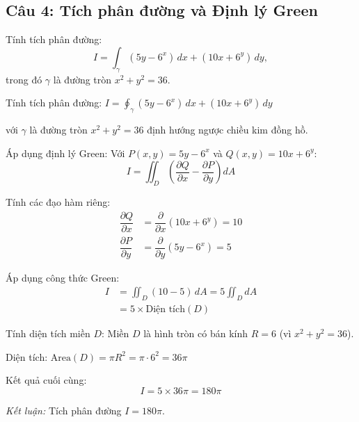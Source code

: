 \subsection*{Câu 4: Tích phân đường và Định lý Green}

\begin{questionbox}
Tính tích phân đường:
\[
    I = \int_\gamma (5y - 6^x)\,dx + (10x + 6^y)\,dy,
\]
trong đó $\gamma$ là đường tròn $x^2 + y^2 = 36$.
\end{questionbox}

\begin{solution}
Tính tích phân đường: $I = \oint_\gamma (5y - 6^x) \, dx + (10x + 6^y) \, dy$

với $\gamma$ là đường tròn $x^2 + y^2 = 36$ định hướng ngược chiều kim đồng hồ.

\textit{} Áp dụng định lý Green:
Với $P(x,y) = 5y - 6^x$ và $Q(x,y) = 10x + 6^y$:
\[
    I = \iint_D \left( \dfrac{\partial Q}{\partial x} - \dfrac{\partial P}{\partial y} \right) dA
\]

\textit{} Tính các đạo hàm riêng:
\begin{align*}
    \dfrac{\partial Q}{\partial x} &= \dfrac{\partial}{\partial x}(10x + 6^y) = 10 \\
    \dfrac{\partial P}{\partial y} &= \dfrac{\partial}{\partial y}(5y - 6^x) = 5
\end{align*}

\textit{} Áp dụng công thức Green:
\begin{align*}
    I &= \iint_D (10 - 5) \, dA = 5 \iint_D dA \\
    &= 5 \times \text{Diện tích}(D)
\end{align*}

\textit{} Tính diện tích miền $D$:
Miền $D$ là hình tròn có bán kính $R = 6$ (vì $x^2 + y^2 = 36$).

Diện tích: $\text{Area}(D) = \pi R^2 = \pi \cdot 6^2 = 36\pi$

\textit{} Kết quả cuối cùng:
\[
    I = 5 \times 36\pi = 180\pi
\]

\textit{Kết luận:} Tích phân đường $I = 180\pi$.
\end{solution}

\newpage